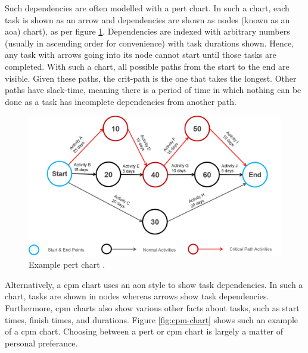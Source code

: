 \documentclass[11pt]{article}
\begin{document}
Such dependencies are often modelled with a \acrfull{pert} chart. In such a chart, each task is shown as an arrow and dependencies are shown as nodes (known as an \acrfull{aoa) chart}), as per figure \ref{fig:pert-chart}. Dependencies are indexed with arbitrary numbers (usually in ascending order for convenience) with task durations shown. Hence, any task with arrows going into its node cannot start until those tasks are completed. With such a chart, all possible paths from the start to the end are visible. Given these paths, the \gls{crit-path} is the one that takes the longest. Other paths have \gls{slack-time}, meaning there is a period of time in which nothing can be done as a task has incomplete dependencies from another path.

\begin{figure}[h!]
    \centering
    \includegraphics[width=\textwidth]{figures/pert.png}
    \caption{Example \acrshort{pert} chart \cite{pert}.}
    \label{fig:pert-chart}
\end{figure}

Alternatively, a \acrfull{cpm} chart uses an \acrfull{aon} style to show task dependencies. In such a chart, tasks are shown in nodes whereas arrows show task dependencies. Furthermore, \acrshort{cpm} charts also show various other facts about tasks, such as start times, finish times, and durations. Figure \ref{fig:cpm-chart} shows such an example of a \acrshort{cpm} chart. Choosing between a \acrshort{pert} or \acrshort{cpm} chart is largely a matter of personal preferance.
\end{document}
